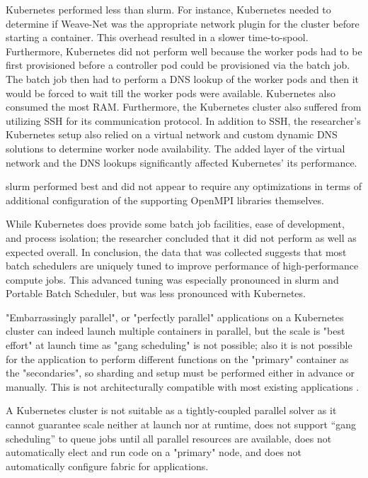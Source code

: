 \documentclass[conference]{IEEEtran}
\begin{document}
Kubernetes performed less than \gls{slurm}. For instance, Kubernetes needed to determine if Weave-Net was the appropriate network plugin for the cluster before starting a container. This overhead resulted in a slower time-to-spool. Furthermore, Kubernetes did not perform well because the worker pods had to be first provisioned before a controller pod could be provisioned via the batch job. The batch job then had to perform a DNS lookup of the worker pods and then it would be forced to wait till the worker pods were available. Kubernetes also consumed the most RAM. Furthermore, the Kubernetes cluster also suffered from utilizing SSH for its communication protocol. In addition to SSH, the researcher's Kubernetes setup also relied on a virtual network and custom dynamic DNS solutions to determine worker node availability. The added layer of the virtual network and the DNS lookups significantly affected Kubernetes' its performance.

\gls{slurm} performed best and did not appear to require any optimizations in terms of additional configuration of the supporting OpenMPI libraries themselves.

While Kubernetes does provide some batch job facilities, ease of development, and process isolation; the researcher concluded that it did not perform as well as expected overall. In conclusion, the data that was collected suggests that most batch schedulers are uniquely tuned to improve performance of high-performance compute jobs. This advanced tuning was especially pronounced in \gls{slurm} and Portable Batch Scheduler, but was less pronounced with Kubernetes.

"Embarrassingly parallel", or "perfectly parallel" applications on a Kubernetes cluster can indeed launch multiple containers in parallel, but the scale is "best effort" at launch time as "gang scheduling" is not possible; also it is not possible for the application to perform different functions on the "primary" container as the "secondaries", so sharding and setup must be performed either in advance or manually. This is not architecturally compatible with most existing applications \cite{hpc-on-kubernetes}.

A Kubernetes cluster is not suitable as a tightly-coupled parallel solver as it cannot guarantee scale neither at launch nor at runtime, does not support “gang scheduling” to queue jobs until all parallel resources are available, does not automatically elect and run code on a "primary" node, and does not automatically configure fabric for applications.
\end{document}
